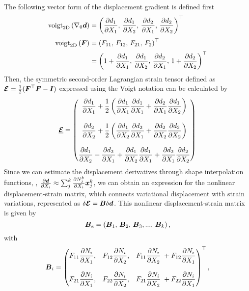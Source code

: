 The following vector form of the displacement gradient is defined first
\begin{align}
\textrm{voigt}_{\textrm{2D}} \left(\nabla_0 {\boldsymbol{d}} \right) & = \left( \frac{\partial d_1}{\partial X_1},\,\frac{\partial d_1}{\partial X_2},\, \frac{\partial d_2}{\partial X_1},\, \frac{\partial d_2}{\partial X_2}\right)^\top \\[0.25em]
\textrm{voigt}_{\textrm{2D}} \left({\boldsymbol{F}}\right) & = \left( F_{11},\,F_{12},\, F_{21},\,F_{2} \right)^\top \notag \\[0.15em] & = \left( 1 + \frac{\partial d_1}{\partial X_1},\,\frac{\partial d_1}{\partial X_2},\, \frac{\partial d_2}{\partial X_1},\,  1 + \frac{\partial d_2}{\partial X_2}\right)^\top 
\label{eq:app:C3:F} 
\end{align}
%
Then, the symmetric second-order Lagrangian strain tensor defined as ${\boldsymbol{\mathcal{E}}} = \frac{1}{2}({\boldsymbol{F}}^\top {\boldsymbol{F}} - \boldsymbol{I})$ expressed using the Voigt notation can be calculated by
%
\begin{equation}
 \underline{\boldsymbol{\mathcal{E}}} = \begin{pmatrix}
\dfrac{\partial d_1}{\partial X_1} + \dfrac{1}{2} \left(\dfrac{\partial d_1}{\partial X_1}\dfrac{\partial d_1}{\partial X_1} + \dfrac{\partial d_2}{\partial X_1}\dfrac{\partial d_1}{\partial X_2} \right) \\[0.25em] \\
\dfrac{\partial d_2}{\partial X_2} + \dfrac{1}{2} \left(\dfrac{\partial d_1}{\partial X_2}\dfrac{\partial d_2}{\partial X_1} + \dfrac{\partial d_2}{\partial X_2}\dfrac{\partial d_2}{\partial X_2} \right) \\[0.25em] \\
\dfrac{\partial d_1}{\partial X_2} + \dfrac{\partial d_2}{\partial X_1} + \dfrac{\partial d_1}{\partial X_2}\dfrac{\partial d_1}{\partial X_1} + \dfrac{\partial d_2}{\partial X_1}\dfrac{\partial d_2}{\partial X_2} 
 \end{pmatrix}
\end{equation}
%
Since we can estimate the displacement derivatives through shape interpolation functions, \ie, $\frac{\partial {\boldsymbol{d}}}{\partial X_i} \approx \sum_{j}^k \frac{\partial N_{j}^k}{\partial X_i}{\boldsymbol{x}}^k_j$, we can obtain an expression for the nonlinear displacement-strain matrix, which connects variational displacement with strain variations, represented as $\delta \boldsymbol{\mathcal{E}} = {\boldsymbol{B}} \delta {\boldsymbol{d}}$. This nonlinear displacement-strain matrix is given by
\begin{equation}
{\boldsymbol{B}}_{e} = \left({\boldsymbol{B}}_1,\,{\boldsymbol{B}}_2,\,{\boldsymbol{B}}_3, ...,\, {\boldsymbol{B}}_{k} \right),
\label{eq:app:C3:straindisplacementmatrix}
\end{equation}
with
\begin{align}
{\boldsymbol{B}}_i = \begin{pmatrix} 
F_{11} \dfrac{\partial N_{i}}{\partial X_1}, & F_{12}  \dfrac{\partial N_{i}}{\partial X_2}, &  F_{11}  \dfrac{\partial N_{i}}{\partial X_2}  \; + F_{12} \dfrac{\partial N_{i}}{\partial X_1} \\[0.25em] \\
F_{21}  \dfrac{\partial N_{i}}{\partial X_1},  & F_{22}  \dfrac{\partial N_{i}}{\partial X_2}, & F_{21}  \dfrac{\partial N_{i}}{\partial X_2} \; + F_{22}  \dfrac{\partial N_{i}}{\partial X_1}  
\end{pmatrix}^\top,
\end{align}
